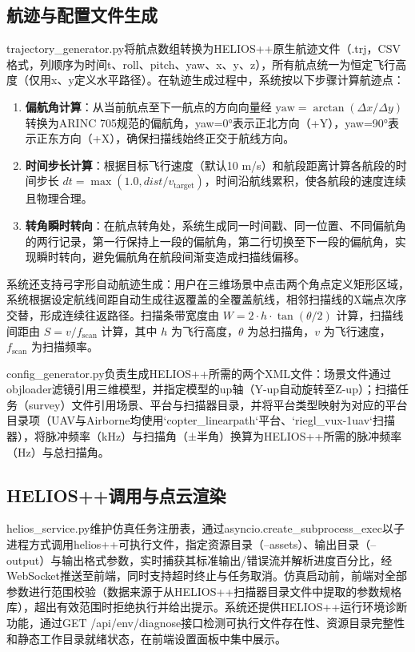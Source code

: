 \documentclass[a4paper,fleqn]{cas-sc}
\begin{document}
\subsection{航迹与配置文件生成}
trajectory\_generator.py将航点数组转换为HELIOS++原生航迹文件（.trj，CSV格式，列顺序为时间t、roll、pitch、yaw、x、y、z），所有航点统一为恒定飞行高度（仅用x、y定义水平路径）。在轨迹生成过程中，系统按以下步骤计算航迹点：

\begin{enumerate}
    \item \textbf{偏航角计算}：从当前航点至下一航点的方向向量经 $\text{yaw} = \arctan(\Delta x / \Delta y)$ 转换为ARINC 705规范的偏航角，yaw=0°表示正北方向（+Y），yaw=90°表示正东方向（+X），确保扫描线始终正交于航线方向。
    \item \textbf{时间步长计算}：根据目标飞行速度（默认10 m/s）和航段距离计算各航段的时间步长 $dt = \max(1.0, dist / v_{\text{target}})$，时间沿航线累积，使各航段的速度连续且物理合理。
    \item \textbf{转角瞬时转向}：在航点转角处，系统生成同一时间戳、同一位置、不同偏航角的两行记录，第一行保持上一段的偏航角，第二行切换至下一段的偏航角，实现瞬时转向，避免偏航角在航段间渐变造成扫描线偏移。
\end{enumerate}

系统还支持弓字形自动航迹生成：用户在三维场景中点击两个角点定义矩形区域，系统根据设定航线间距自动生成往返覆盖的全覆盖航线，相邻扫描线的X端点次序交替，形成连续往返路径。扫描条带宽度由 $W = 2 \cdot h \cdot \tan(\theta / 2)$ 计算，扫描线间距由 $S = v / f_{\text{scan}}$ 计算，其中 $h$ 为飞行高度，$\theta$ 为总扫描角，$v$ 为飞行速度，$f_{\text{scan}}$ 为扫描频率。

config\_generator.py负责生成HELIOS++所需的两个XML文件：场景文件通过objloader滤镜引用三维模型，并指定模型的up轴（Y-up自动旋转至Z-up）；扫描任务（survey）文件引用场景、平台与扫描器目录，并将平台类型映射为对应的平台目录项（UAV与Airborne均使用`copter\_linearpath`平台、`riegl\_vux-1uav`扫描器），将脉冲频率（kHz）与扫描角（±半角）换算为HELIOS++所需的脉冲频率（Hz）与总扫描角。

\subsection{HELIOS++调用与点云渲染}
helios\_service.py维护仿真任务注册表，通过asyncio.create\_subprocess\_exec以子进程方式调用helios++可执行文件，指定资源目录（--assets）、输出目录（--output）与输出格式参数，实时捕获其标准输出/错误流并解析进度百分比，经WebSocket推送至前端，同时支持超时终止与任务取消。仿真启动前，前端对全部参数进行范围校验（数据来源于从HELIOS++扫描器目录文件中提取的参数规格库），超出有效范围时拒绝执行并给出提示。系统还提供HELIOS++运行环境诊断功能，通过GET /api/env/diagnose接口检测可执行文件存在性、资源目录完整性和静态工作目录就绪状态，在前端设置面板中集中展示。
\end{document}
